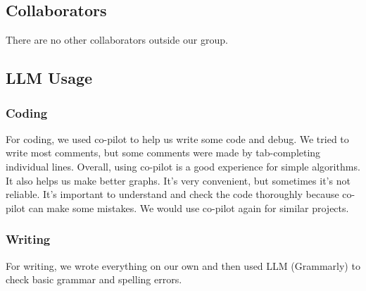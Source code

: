 \documentclass[11pt,letterpaper]{article}
\begin{document}
\subsection{Collaborators}
There are no other collaborators outside our group.
\subsection{LLM Usage}

\subsubsection*{Coding}
For coding, we used co-pilot to help us write some code and debug. We tried to write most comments, but some comments were made by tab-completing individual lines. Overall, using co-pilot is a good experience for simple algorithms. It also helps us make better graphs. It's very convenient, but sometimes it's not reliable. It's important to understand and check the code thoroughly because co-pilot can make some mistakes. We would use co-pilot again for similar projects.

\subsubsection*{Writing}
For writing, we wrote everything on our own and then used LLM (Grammarly) to check basic grammar and spelling errors.
\end{document}
